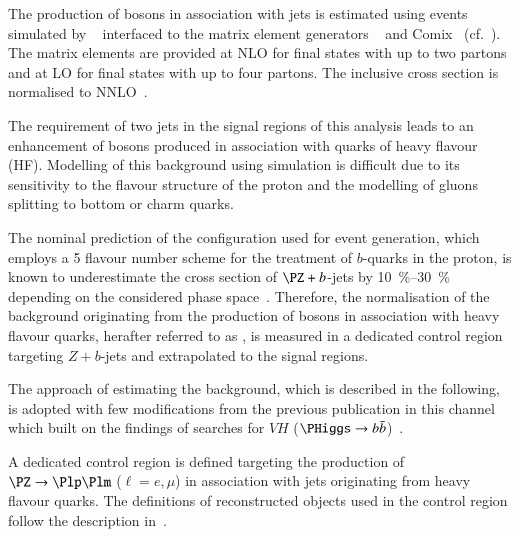 %
%

The production of \PZ bosons in association with jets is estimated
using events simulated by \SHERPA[2.2.1]~\cite{Bothmann:2019yzt}
interfaced to the matrix element generators
\OPENLOOPS~\cite{Buccioni:2019sur,Cascioli:2011va,Denner:2016kdg} and
Comix~\cite{Gleisberg:2008fv} (cf.\
). The matrix elements are provided at
NLO for final states with up to two partons and at LO for final states
with up to four partons. The inclusive cross section is normalised to
NNLO~\cite{Anastasiou:2003ds}.

The requirement of two \btagged jets in the signal regions of this
analysis leads to an enhancement of \PZ bosons produced in association
with quarks of heavy flavour (HF). Modelling of this background using
simulation is difficult due to its sensitivity to the flavour
structure of the proton and the modelling of gluons splitting to
bottom or charm quarks.

The nominal prediction of the \SHERPA[2.2.1] configuration used for
event generation, which employs a 5 flavour number scheme for the
treatment of $b$-quarks in the proton, is known to underestimate the
cross section of $\PZ + b$-jets by \SIrange{10}{30}{\percent}
depending on the considered phase
space~\cite{STDM-2017-38}. Therefore, the normalisation of the
background originating from the production of \PZ bosons in
association with heavy flavour quarks, herafter referred to as \ZHF,
is measured in a dedicated control region targeting $Z + b$-jets and
extrapolated to the signal regions.

The approach of estimating the \ZHF background, which is described in
the following, is adopted with few modifications from the previous
publication in this channel~\cite{HIGG-2016-16-witherratum} which
built on the findings of searches for $VH$
($\PHiggs \to \bbbar$)~\cite{HIGG-2016-29}.

A dedicated control region is defined targeting the production of
$\PZ \ra \Plp\Plm$ ($\ell = e , \mu$) in association with jets
originating from heavy flavour quarks. The definitions of
reconstructed objects used in the control region follow the
description in~.

